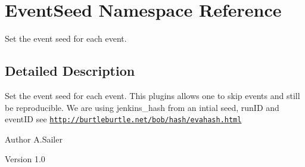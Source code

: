 \hypertarget{namespace_event_seed}{
\section{EventSeed Namespace Reference}
\label{namespace_event_seed}
}


Set the event seed for each event.  


\subsection{Detailed Description}
Set the event seed for each event. This plugins allows one to skip events and still be reproducible. We are using jenkins\_\-hash from an intial seed, runID and eventID see \href{http://burtleburtle.net/bob/hash/evahash.html}{\tt http://burtleburtle.net/bob/hash/evahash.html}

\begin{DoxyAuthor}{Author}
A.Sailer 
\end{DoxyAuthor}
\begin{DoxyVersion}{Version}
1.0 
\end{DoxyVersion}
